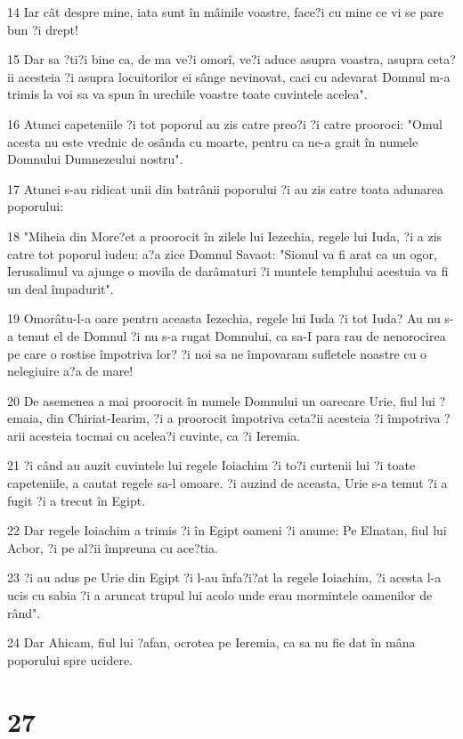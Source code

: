 \par 14 Iar cât despre mine, iata sunt în mâinile voastre, face?i cu mine ce vi se pare bun ?i drept!
\par 15 Dar sa ?ti?i bine ca, de ma ve?i omorî, ve?i aduce asupra voastra, asupra ceta?ii acesteia ?i asupra locuitorilor ei sânge nevinovat, caci cu adevarat Domnul m-a trimis la voi sa va spun în urechile voastre toate cuvintele acelea".
\par 16 Atunci capeteniile ?i tot poporul au zis catre preo?i ?i catre prooroci: "Omul acesta nu este vrednic de osânda cu moarte, pentru ca ne-a grait în numele Domnului Dumnezeului nostru".
\par 17 Atunci s-au ridicat unii din batrânii poporului ?i au zis catre toata adunarea poporului:
\par 18 "Miheia din More?et a proorocit în zilele lui Iezechia, regele lui Iuda, ?i a zis catre tot poporul iudeu: a?a zice Domnul Savaot: "Sionul va fi arat ca un ogor, Ierusalimul va ajunge o movila de darâmaturi ?i muntele templului acestuia va fi un deal împadurit".
\par 19 Omorâtu-l-a oare pentru aceasta Iezechia, regele lui Iuda ?i tot Iuda? Au nu s-a temut el de Domnul ?i nu s-a rugat Domnului, ca sa-I para rau de nenorocirea pe care o rostise împotriva lor? ?i noi sa ne împovaram sufletele noastre cu o nelegiuire a?a de mare!
\par 20 De asemenea a mai proorocit în numele Domnului un oarecare Urie, fiul lui ?emaia, din Chiriat-Iearim, ?i a proorocit împotriva ceta?ii acesteia ?i împotriva ?arii acesteia tocmai cu acelea?i cuvinte, ca ?i Ieremia.
\par 21 ?i când au auzit cuvintele lui regele Ioiachim ?i to?i curtenii lui ?i toate capeteniile, a cautat regele sa-l omoare. ?i auzind de aceasta, Urie s-a temut ?i a fugit ?i a trecut în Egipt.
\par 22 Dar regele Ioiachim a trimis ?i în Egipt oameni ?i anume: Pe Elnatan, fiul lui Acbor, ?i pe al?ii împreuna cu ace?tia.
\par 23 ?i au adus pe Urie din Egipt ?i l-au înfa?i?at la regele Ioiachim, ?i acesta l-a ucis cu sabia ?i a aruncat trupul lui acolo unde erau mormintele oamenilor de rând".
\par 24 Dar Ahicam, fiul lui ?afan, ocrotea pe Ieremia, ca sa nu fie dat în mâna poporului spre ucidere.

\chapter{27}


